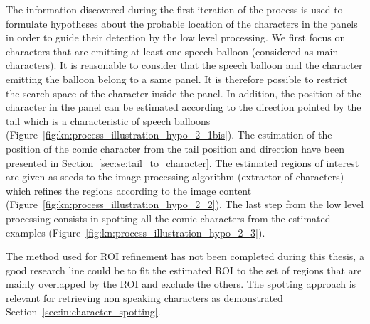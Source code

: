 The information discovered during the first iteration of the process is used to formulate hypotheses about the probable location of the characters in the panels in order to guide their detection by the low level processing.
We first focus on characters that are emitting at least one speech balloon (considered as main characters).
It is reasonable to consider that the speech balloon and the character emitting the balloon belong to a same panel.
It is therefore possible to restrict the search space of the character inside the panel.
In addition, the position of the character in the panel can be estimated according to the direction pointed by the tail which is a characteristic of speech balloons (Figure~\ref{fig:kn:process_illustration_hypo_2_1bis}).
The estimation of the position of the comic character from the tail position and direction have been presented in Section~\ref{sec:se:tail_to_character}.
The estimated regions of interest are given as seeds to the image processing algorithm (extractor of characters) which refines the regions according to the image content (Figure~\ref{fig:kn:process_illustration_hypo_2_2}).
The last step from the low level processing consists in spotting all the comic characters from the estimated examples (Figure~\ref{fig:kn:process_illustration_hypo_2_3}).

The method used for ROI refinement has not been completed during this thesis, a good research line could be to fit the estimated ROI to the set of regions that are mainly overlapped by the ROI and exclude the others.
The spotting approach is relevant for retrieving non speaking characters as demonstrated Section~\ref{sec:in:character_spotting}.



